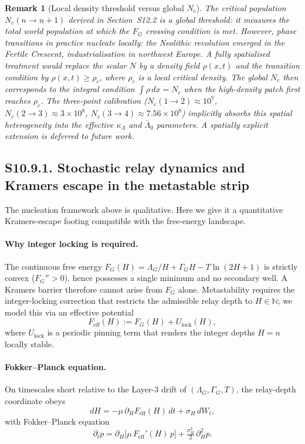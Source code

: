 \documentclass[11pt]{article}
\newtheorem{remark}{Remark}
\begin{document}
\begin{remark}[Local density threshold versus global $N_c$]
The critical population $N_c(n\!\to\!n{+}1)$ derived in Section~S12.2 is a
\emph{global} threshold: it measures the total world population at which the
$F_G$ crossing condition is met. However, phase transitions in practice
nucleate \emph{locally}: the Neolithic revolution emerged in the Fertile Crescent,
industrialisation in northwest Europe. A fully spatialised treatment would
replace the scalar $N$ by a density field $\rho(x,t)$ and the transition
condition by $\rho(x,t) \ge \rho_c$, where $\rho_c$ is a local critical
density. The global $N_c$ then corresponds to the integral condition
$\int \rho\,dx = N_c$ when the high-density patch first reaches $\rho_c$.
The three-point calibration ($N_c(1\!\to\!2) \approx 10^7$,
$N_c(2\!\to\!3) \approx 3\times 10^8$,
$N_c(3\!\to\!4) \approx 7.56\times 10^8$) implicitly absorbs this spatial
heterogeneity into the effective $\kappa_\Lambda$ and $\bar\Lambda_0$ parameters.
A spatially explicit extension is deferred to future work.
\end{remark}

\subsection*{S10.9.1. Stochastic relay dynamics and Kramers escape in the metastable strip}

The nucleation framework above is qualitative.  Here we give it a
quantitative Kramers-escape footing compatible with the free-energy
landscape.

\paragraph{Why integer locking is required.}
The continuous free energy $F_G(H)=\Lambda_G/H+\Gamma_G H-T\ln(2H+1)$
is strictly convex ($F_G''>0$), hence possesses a single minimum and no
secondary well.  A Kramers barrier therefore cannot arise from $F_G$
alone.  Metastability requires the integer-locking correction that
restricts the admissible relay depth to $H\in\mathbb{N}$;
we model this via an effective potential
\[
F_{\mathrm{eff}}(H) := F_G(H) + U_{\mathrm{lock}}(H),
\]
where $U_{\mathrm{lock}}$ is a periodic pinning term that renders the
integer depths $H=n$ locally stable.

\paragraph{Fokker--Planck equation.}
On timescales short relative to the Layer-3 drift of
$(\Lambda_G,\Gamma_G,T)$, the relay-depth coordinate obeys
\[
dH = -\mu\,\partial_H F_{\mathrm{eff}}(H)\,dt + \sigma_H\,dW_t,
\]
with Fokker--Planck equation
\[
\partial_t p = \partial_H\!\bigl[\mu\,F_{\mathrm{eff}}'(H)\,p\bigr]
  + \tfrac{\sigma_H^2}{2}\,\partial_H^2 p.
\]
\end{document}
